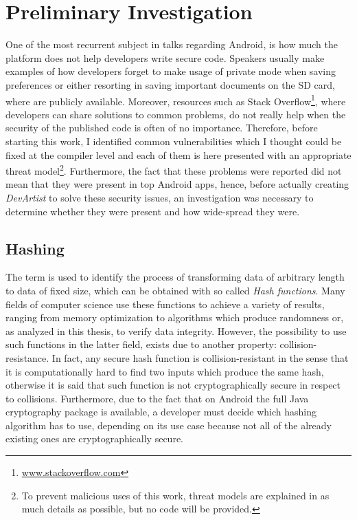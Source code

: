 \chapter{Preliminary Investigation}
\label{ch:investigation}
One of the most recurrent subject in talks regarding Android, is how much the platform does not help developers write secure code. Speakers usually make examples of how developers forget to make usage of private mode when saving preferences or either resorting in saving important documents on the SD card, where are publicly available\cite{codemotion}. Moreover, resources such as Stack Overflow\footnote{\url{www.stackoverflow.com}}, where developers can share solutions to common problems, do not really help when the security of the published code is often of no importance. Therefore, before starting this work, I identified common vulnerabilities which I thought could be fixed at the compiler level and each of them is here presented with an appropriate threat model\footnote{To prevent malicious uses of this work, threat models are explained in as much details as possible, but no code will be provided.}. Furthermore, the fact that these problems were reported did not mean that they were present in top Android apps, hence, before actually creating \emph{DevArtist} to solve these security issues, an investigation was necessary to determine whether they were present and how wide-spread they were.

\section{Hashing}
The term is used to identify the process of transforming data of arbitrary length to data of fixed size, which can be obtained with so called \emph{Hash functions}. Many fields of computer science use these functions to achieve a variety of results, ranging from memory optimization to algorithms which produce randomness or, as analyzed in this thesis, to verify data integrity. However, the possibility to use such functions in the latter field, exists due to another property: collision-resistance. In fact, any secure hash function is collision-resistant in the sense that it is computationally hard to find two inputs which produce the same hash, otherwise it is said that such function is not cryptographically secure in respect to collisions. Furthermore, due to the fact that on Android the full Java cryptography package is available, a developer must decide which hashing algorithm has to use, depending on its use case because not all of the already existing ones are cryptographically secure.


